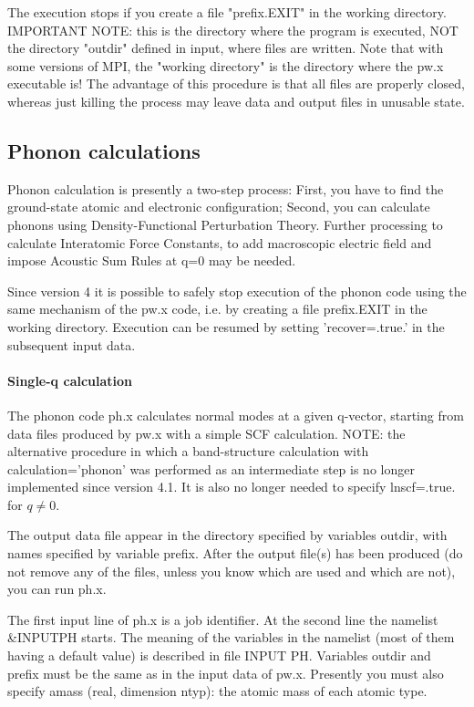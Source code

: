 \documentclass[12pt,a4paper]{article}
\begin{document}
The execution stops if you create a file "prefix.EXIT" in the working 
directory. IMPORTANT NOTE: this is the directory where the program 
is executed, NOT the directory "outdir" defined in input, where files 
are written. Note that with some versions of MPI, the "working directory" 
is the directory where the pw.x executable is! The advantage of this 
procedure is that all files are properly closed, whereas  just killing 
the process may leave data and output files in unusable state.

\subsection{Phonon calculations}

Phonon calculation is presently a two-step process:
First, you have to find the ground-state atomic and electronic configuration;
Second, you can calculate phonons using Density-Functional Perturbation Theory.
Further processing to calculate Interatomic Force Constants, to add macroscopic
electric field and impose Acoustic Sum Rules at q=0 may be needed.

Since version 4 it is possible to safely stop execution of the phonon code using
the same mechanism of the pw.x code, i.e. by creating a file prefix.EXIT in the 
working directory. Execution can be resumed by setting 'recover=.true.' in the
subsequent input data.

\paragraph{Single-q calculation}

The phonon code ph.x calculates normal modes at a given q-vector, starting
from data files produced by pw.x with a simple SCF calculation.
NOTE: the alternative procedure in which a band-structure calculation 
with calculation='phonon' was performed as an intermediate step is no
longer implemented since version 4.1. It is also no longer needed to
specify lnscf=.true. for $q\ne 0$.

The output data file appear in the directory specified by variables outdir,
with names specified by variable prefix. After the output file(s) has been
produced (do not remove any of the files, unless you know which are used
and which are not), you can run ph.x.
    
The first input line of ph.x is a job identifier. At the second line the
namelist \&INPUTPH starts. The meaning of the variables in the namelist
(most of them having a default value) is described in file INPUT PH. Variables
outdir and prefix must be the same as in the input data of pw.x. Presently
you must also specify amass (real, dimension ntyp): the atomic mass of each
atomic type.
\end{document}
